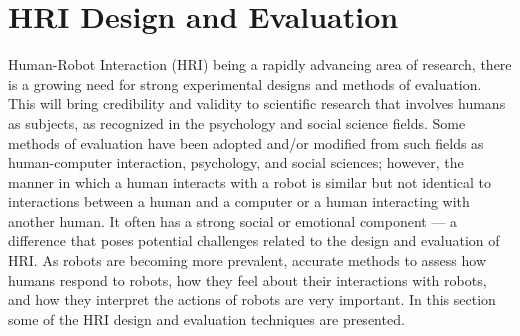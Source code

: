 {\section{HRI Design and Evaluation} %
Human-Robot Interaction (HRI) being a rapidly advancing area of research, there is a growing need for strong experimental designs and methods of evaluation. This will bring credibility and validity to scientific research that involves humans as subjects, as recognized in the psychology and social science fields. Some methods of evaluation have been adopted and/or modified from such fields as human-computer interaction, psychology, and social sciences; however, the manner in which a human interacts with a robot is similar but not identical to interactions between a human and a computer or a human interacting with another human. It often has a strong social or emotional component — a difference that poses potential challenges related to the design and evaluation of HRI. As robots are becoming more prevalent, accurate methods to assess how humans respond to robots, how they feel about their interactions with robots, and how they interpret the actions of robots are very important. In this section some of the HRI design and evaluation techniques are presented.

}

